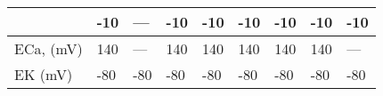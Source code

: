 \documentclass[12pt]{article}
\begin{document}
\begin{table}[h]
\begin{center}
\begin{tabular}{ |p{2cm} | p{1.25cm} |p{1.25cm} |p{1.25cm} |p{1.25cm} |p{1.25cm} |p{1.25cm} |p{1.25cm} |p{1.25cm} | }
& -10 & --- & -10 & -10 & -10 & -10 & -10 & -10 \\ \hline  ECa, (mV) & 140 & --- & 140 & 140 & 140 & 140 & 140 & --- \\ \hline  EK (mV) & -80 & -80 & -80 & -80 & -80 & -80 & -80 & -80 \\ \hline  
			
		\end{tabular}
	\end{center}
\end{table}
\end{document}
